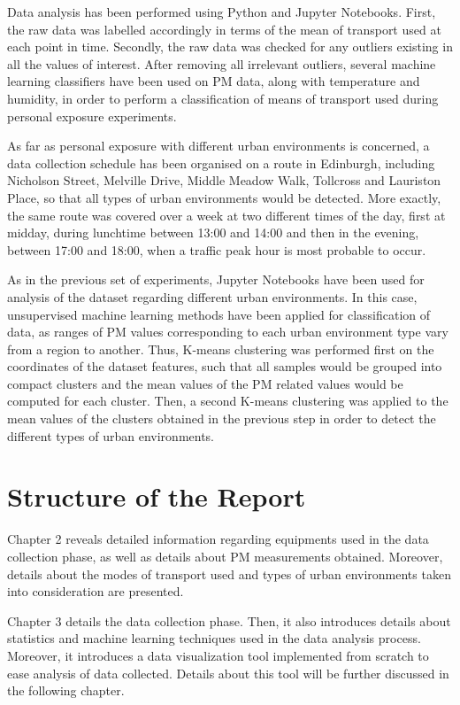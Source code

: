 \documentclass[bsc,frontabs,twoside,singlespacing,parskip,deptreport]{infthesis}     %
\begin{document}
Data analysis has been performed using Python and Jupyter Notebooks. First, the raw data was labelled accordingly in terms of the mean of transport used at each point in time. Secondly, the raw data was checked for any outliers existing in all the values of interest. After removing all irrelevant outliers, several machine learning classifiers have been used on PM data, along with temperature and humidity, in order to perform a classification of means of transport used during personal exposure experiments.

As far as personal exposure with different urban environments is concerned, a data collection schedule has been organised on a route in Edinburgh, including Nicholson Street, Melville Drive, Middle Meadow Walk, Tollcross and Lauriston Place, so that all types of urban environments would be detected. More exactly, the same route was covered over a week at two different times of the day, first at midday, during lunchtime between 13:00 and 14:00 and then in the evening, between 17:00 and 18:00, when a traffic peak hour is most probable to occur.

As in the previous set of experiments, Jupyter Notebooks have been used for analysis of the dataset regarding different urban environments. In this case, unsupervised machine learning methods have been applied for classification of data, as ranges of PM values corresponding to each urban environment type vary from a region to another. Thus, K-means clustering was performed first on the coordinates of the dataset features, such that all samples would be grouped into compact clusters and the mean values of the PM related values would be computed for each cluster. Then, a second K-means clustering was applied to the mean values of the clusters obtained in the previous step in order to detect the different types of urban environments.

\section{Structure of the Report}

Chapter 2 reveals detailed information regarding equipments used in the data collection phase, as well as details about PM measurements obtained. Moreover, details about the modes of transport used and types of urban environments taken into consideration are presented.

Chapter 3 details the data collection phase. Then, it also introduces details about statistics and machine learning techniques used in the data analysis process. Moreover, it introduces a data visualization tool implemented from scratch to ease analysis of data collected. Details about this tool will be further discussed in the following chapter.
\end{document}
